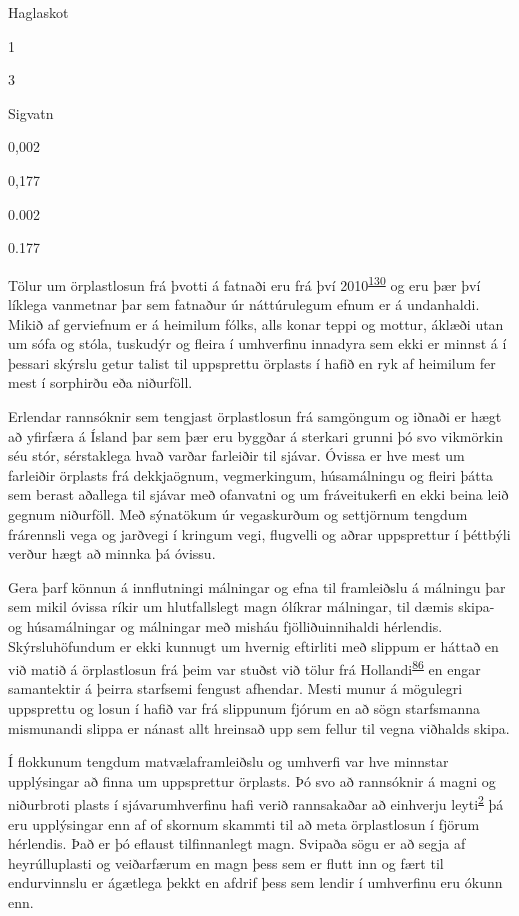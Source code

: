 \documentclass[icelandic,]{book}
\begin{document}
Haglaskot

1

3

Sigvatn

0,002

0,177

0.002

0.177

Tölur um örplastlosun frá þvotti á fatnaði eru frá því 2010\textsuperscript{\protect\hyperlink{ref-pakula2010electricity}{130}} og eru þær því líklega vanmetnar þar sem fatnaður úr náttúrulegum efnum er á undanhaldi. Mikið af gerviefnum er á heimilum fólks, alls konar teppi og mottur, áklæði utan um sófa og stóla, tuskudýr og fleira í umhverfinu innadyra sem ekki er minnst á í þessari skýrslu getur talist til uppsprettu örplasts í hafið en ryk af heimilum fer mest í sorphirðu eða niðurföll.

Erlendar rannsóknir sem tengjast örplastlosun frá samgöngum og iðnaði er hægt að yfirfæra á Ísland þar sem þær eru byggðar á sterkari grunni þó svo vikmörkin séu stór, sérstaklega hvað varðar farleiðir til sjávar. Óvissa er hve mest um farleiðir örplasts frá dekkjaögnum, vegmerkingum, húsamálningu og fleiri þátta sem berast aðallega til sjávar með ofanvatni og um fráveitukerfi en ekki beina leið gegnum niðurföll. Með sýnatökum úr vegaskurðum og settjörnum tengdum frárennsli vega og jarðvegi í kringum vegi, flugvelli og aðrar uppsprettur í þéttbýli verður hægt að minnka þá óvissu.

Gera þarf könnun á innflutningi málningar og efna til framleiðslu á málningu þar sem mikil óvissa ríkir um hlutfallslegt magn ólíkrar málningar, til dæmis skipa- og húsamálningar og málningar með misháu fjölliðuinnihaldi hérlendis. Skýrsluhöfundum er ekki kunnugt um hvernig eftirliti með slippum er háttað en við matið á örplastlosun frá þeim var stuðst við tölur frá Hollandi\textsuperscript{\protect\hyperlink{ref-Verschoor2016}{86}} en engar samantektir á þeirra starfsemi fengust afhendar. Mesti munur á mögulegri uppsprettu og losun í hafið var frá slippunum fjórum en að sögn starfsmanna mismunandi slippa er nánast allt hreinsað upp sem fellur til vegna viðhalds skipa.

Í flokkunum tengdum matvælaframleiðslu og umhverfi var hve minnstar upplýsingar að finna um uppsprettur örplasts. Þó svo að rannsóknir á magni og niðurbroti plasts í sjávarumhverfinu hafi verið rannsakaðar að einhverju leyti\textsuperscript{\protect\hyperlink{ref-Andrady2017}{2}} þá eru upplýsingar enn af of skornum skammti til að meta örplastlosun í fjörum hérlendis. Það er þó eflaust tilfinnanlegt magn. Svipaða sögu er að segja af heyrúlluplasti og veiðarfærum en magn þess sem er flutt inn og fært til endurvinnslu er ágætlega þekkt en afdrif þess sem lendir í umhverfinu eru ókunn enn.
\end{document}
